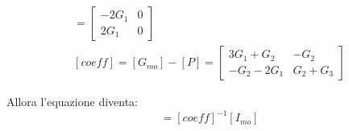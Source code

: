 \documentclass{article}
\numberwithin{equation}{subsection}
\begin{document}
\begin{gather*}
    [P]=\begin{bmatrix}
        -2G_1&0\\
        2G_1&0
    \end{bmatrix}\\
    [{coeff}]=[G_{mo}]-[P]=\begin{bmatrix}
        3G_1+G_2&-G_2\\
        -G_2-2G_1&G_2+G_3
    \end{bmatrix}
\end{gather*}

Allora l'equazione diventa:
\begin{equation*}
    [V_{mo}]=[coeff]^{-1}[I_{mo}]
\end{equation*}
\end{document}
